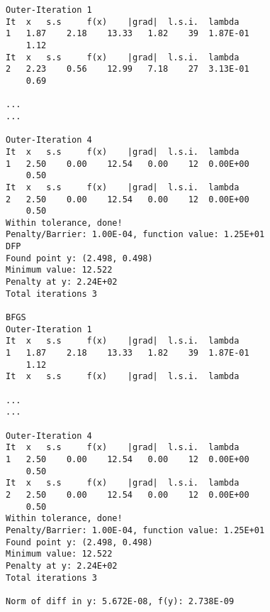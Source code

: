 \begin{verbatim}
Outer-Iteration 1
It 	x 	s.s 	f(x) 	|grad| 	l.s.i. 	lambda
1 	1.87 	2.18 	13.33 	1.82 	39 	1.87E-01
 	1.12
It 	x 	s.s 	f(x) 	|grad| 	l.s.i. 	lambda
2 	2.23 	0.56 	12.99 	7.18 	27 	3.13E-01
 	0.69
  
...
...

Outer-Iteration 4
It 	x 	s.s 	f(x) 	|grad| 	l.s.i. 	lambda
1 	2.50 	0.00 	12.54 	0.00 	12 	0.00E+00
 	0.50
It 	x 	s.s 	f(x) 	|grad| 	l.s.i. 	lambda
2 	2.50 	0.00 	12.54 	0.00 	12 	0.00E+00
 	0.50
Within tolerance, done!
Penalty/Barrier: 1.00E-04, function value: 1.25E+01
DFP
Found point y: (2.498, 0.498)
Minimum value: 12.522
Penalty at y: 2.24E+02
Total iterations 3

BFGS
Outer-Iteration 1
It 	x 	s.s 	f(x) 	|grad| 	l.s.i. 	lambda
1 	1.87 	2.18 	13.33 	1.82 	39 	1.87E-01
 	1.12
It 	x 	s.s 	f(x) 	|grad| 	l.s.i. 	lambda

...
...

Outer-Iteration 4
It 	x 	s.s 	f(x) 	|grad| 	l.s.i. 	lambda
1 	2.50 	0.00 	12.54 	0.00 	12 	0.00E+00
 	0.50
It 	x 	s.s 	f(x) 	|grad| 	l.s.i. 	lambda
2 	2.50 	0.00 	12.54 	0.00 	12 	0.00E+00
 	0.50
Within tolerance, done!
Penalty/Barrier: 1.00E-04, function value: 1.25E+01
Found point y: (2.498, 0.498)
Minimum value: 12.522
Penalty at y: 2.24E+02
Total iterations 3

Norm of diff in y: 5.672E-08, f(y): 2.738E-09
\end{verbatim}

